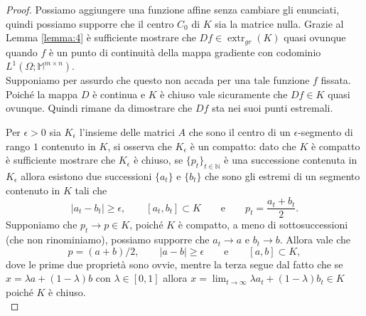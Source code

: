\documentclass[a4paper,11pt]{book}
\theoremstyle{plain}
\theoremstyle{definition}
\theoremstyle{remark}
\newcommand{\N}{\mathbb{N}}
\newcommand{\M}{\mathbb{M}}
\DeclareMathOperator{\extr}{extr}
\begin{document}
\begin{proof}
	Possiamo aggiungere una funzione affine senza cambiare gli enunciati, quindi possiamo supporre che il centro $C_{0}$ di $K$ sia la matrice nulla. Grazie al Lemma \ref{lemma:4} è sufficiente mostrare che $Df\in \extr_{gr}(K)$ quasi ovunque quando $f$ è un punto di continuità della mappa gradiente con codominio $L^{1}(\Omega;\M^{m\times n})$.\\
	Supponiamo per assurdo che questo non accada per una tale funzione $f$ fissata. Poiché la mappa $D$ è continua e $K$ è chiuso vale sicuramente che $Df\in K$ quasi ovunque. Quindi rimane da dimostrare che $Df$ sta nei suoi punti estremali.
	
	Per $\epsilon>0$ sia $K_{\epsilon}$ l'insieme delle matrici $A$ che sono il centro di un $\epsilon$-segmento di rango $1$ contenuto in $K$, si osserva che $K_{\epsilon}$ è un compatto: dato che $K$ è compatto è sufficiente mostrare che $K_{\epsilon}$ è chiuso, se $\{p_{t}\}_{t\in\N}$ è una successione contenuta in $K_{\epsilon}$ allora esistono due successioni $\{a_{t}\}$ e $\{b_{t}\}$ che sono gli estremi di un segmento contenuto in $K$ tali che
	\[ 
		|a_{t}-b_{t}|\geq \epsilon, \qquad [a_{t},b_{t}]\subset K\qquad \text{e}\qquad p_{t}=\frac{a_{t}+b_{t}}{2}.
	\]
	Supponiamo che $p_{t}\to p\in K$, poiché $K$ è compatto, a meno di sottosuccessioni (che non rinominiamo), possiamo supporre che $a_{t}\to a$ e $b_{t}\to b$. Allora vale che
	\[
		p=(a+b)/2,\qquad|a-b|\geq \epsilon\qquad \text{e}\qquad [a,b]\subset K,
	\]
	dove le prime due proprietà sono ovvie, mentre la terza segue dal fatto che se $x=\lambda a+(1-\lambda)b$ con $\lambda\in[0,1]$ allora $x=\lim_{t\to\infty}\lambda a_{t}+(1-\lambda)b_{t}\in K$ poiché $K$ è chiuso.\\
	

\end{proof}
\end{document}
